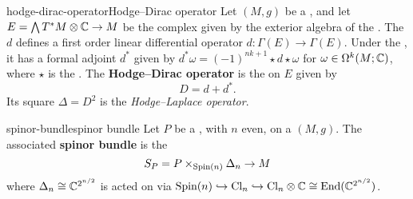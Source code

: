 \begin{topic}{hodge-dirac-operator}{Hodge--Dirac operator}
    Let $(M, g)$ be a , and let $E = \bigwedge T^*M \otimes \mathbb{C} \to M$ be the complex  given by the exterior algebra of the . The  $d$ defines a first order linear differential operator $d : \Gamma(E) \to \Gamma(E)$. Under the , it has a formal adjoint $d^*$ given by $d^* \omega = (-1)^{nk + 1} \star d \star \omega$ for $\omega \in \Omega^k(M; \mathbb{C})$, where $\star$ is the . The \textbf{Hodge--Dirac operator} is the  on $E$ given by
    \[ D = d + d^* . \]
    Its square $\Delta = D^2$ is the \textit{Hodge--Laplace operator}.
\end{topic}

\begin{topic}{spinor-bundle}{spinor bundle}
    Let $P$ be a , with $n$ even, on a  $(M, g)$. The associated \textbf{spinor bundle} is the 
    \[ S_P = P \times_{\textup{Spin}(n)} \Delta_n \to M \]
    where $\Delta_n \cong \mathbb{C}^{2^{n/2}}$ is acted on via $\textup{Spin}(n) \hookrightarrow \textup{Cl}_n \hookrightarrow \textup{Cl}_n \otimes \mathbb{C} \cong \operatorname{End}(\mathbb{C}^{2^{n/2}})$.
\end{topic}
